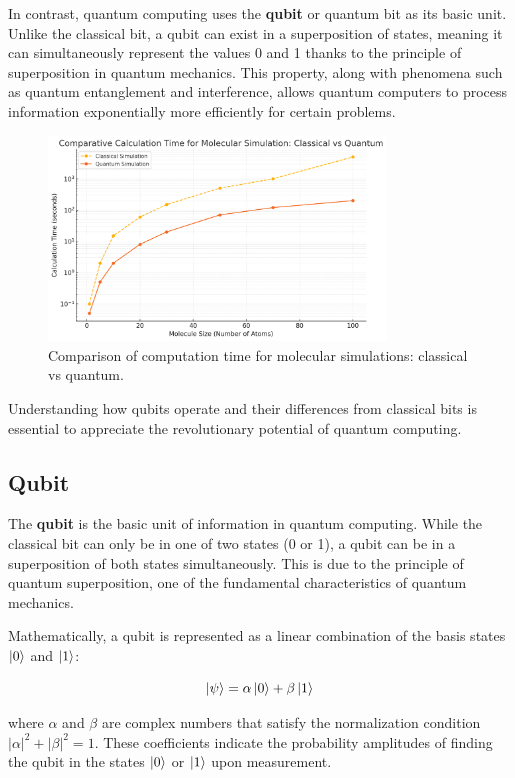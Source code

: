 In contrast, quantum computing uses the \textbf{qubit} or quantum bit as its basic unit. Unlike the classical bit, a qubit can exist in a superposition of states, meaning it can simultaneously represent the values 0 and 1 thanks to the principle of superposition in quantum mechanics. This property, along with phenomena such as quantum entanglement and interference, allows quantum computers to process information exponentially more efficiently for certain problems.

\begin{figure}[H]
    \centering
    \includegraphics[width=0.8\textwidth]{img/bit_vs_qbit.png}
    \caption{Comparison of computation time for molecular simulations: classical vs quantum.}
    \label{fig:bit_vs_qubit}
\end{figure}

Understanding how qubits operate and their differences from classical bits is essential to appreciate the revolutionary potential of quantum computing.

\subsection{Qubit}

The \textbf{qubit} is the basic unit of information in quantum computing. While the classical bit can only be in one of two states (0 or 1), a qubit can be in a superposition of both states simultaneously. This is due to the principle of quantum superposition, one of the fundamental characteristics of quantum mechanics.

Mathematically, a qubit is represented as a linear combination of the basis states $\ket{0}$ and $\ket{1}$:

\[
\ket{\psi} = \alpha\ket{0} + \beta\ket{1}
\]

where $\alpha$ and $\beta$ are complex numbers that satisfy the normalization condition $|\alpha|^2 + |\beta|^2 = 1$. These coefficients indicate the probability amplitudes of finding the qubit in the states $\ket{0}$ or $\ket{1}$ upon measurement.

